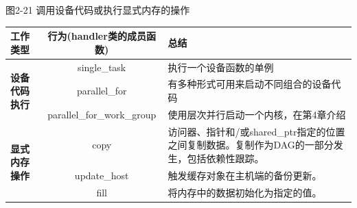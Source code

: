 \hspace*{\fill} \par %
图2-21 调用设备代码或执行显式内存的操作
\begin{table}[H]
	\begin{tabular}{|m{32mm}|c|p{6cm}|}
		\hline
		\multicolumn{1}{|l|}{\textbf{工作类型}}            & \multicolumn{1}{|c|}{\textbf{行为(handler类的成员函数)}} & \textbf{总结}                                                                                                                                   \\ \hline
		\multirow{3}{10em}{\textbf{设备代码执行}}     & single\_task                                                 & 执行一个设备函数的单例                                                                                                   \\ \cline{2-3} 
		& parallel\_for                                                & 有多种形式可用来启动不同组合的设备代码                                                       \\ \cline{2-3} 
		& parallel\_for\_work\_group                                   & 使用层次并行启动一个内核，在第4章介绍                                                                       \\ \hline
		\multirow{3}{10em}{\textbf{显式内存操作}} & copy                                                         & 访问器、指针和/或shared\_ptr指定的位置之间复制数据。复制作为DAG的一部分发生，包括依赖性跟踪。 \\ \cline{2-3} 
		& update\_host                                                 & 触发缓存对象在主机端的备份更新。                                                                                          \\ \cline{2-3} 
		& fill                                                         & 将内存中的数据初始化为指定的值。                                                                                               \\ \hline
	\end{tabular}
\end{table}

